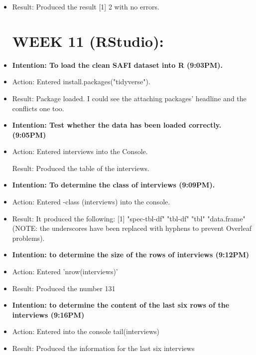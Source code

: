 \documentclass[a4paper,12pt]{article}
\begin{document}
\begin{itemize}
\item Result: Produced the result [1] 2 with no errors. 


\section{WEEK 11 (RStudio):}

\item \textbf{Intention: To load the clean SAFI dataset into R (9:03PM).}


\item Action: Entered install.packages("tidyverse"). 


\item Result: Package loaded. I could see the attaching packages' headline and the conflicts one too.


\item \textbf{Intention: Test whether the data has been loaded correctly. (9:05PM)}


\item Action: Entered interviews into the Console.


\result Result: Produced the table of the interviews.


\item \textbf{Intention: To determine the class of interviews (9:09PM).}


\item Action: Entered -class (interviews) into the console. 

\item Result: It produced the following: [1] "spec-tbl-df" "tbl-df"      "tbl"         "data.frame" (NOTE: the underscores have been replaced with hyphens to prevent Overleaf problems).


\item \textbf{Intention: to determine the size of the rows of interviews (9:12PM)}


\item Action: Entered 'nrow(interviews)'


\item Result: Produced the number 131


\item \textbf{Intention: to determine the content of the last six rows of the interviews (9:16PM)}


\item Action: Entered into the console tail(interviews)


\item Result: Produced the information for the last six interviews 



\end{itemize}
\end{document}
